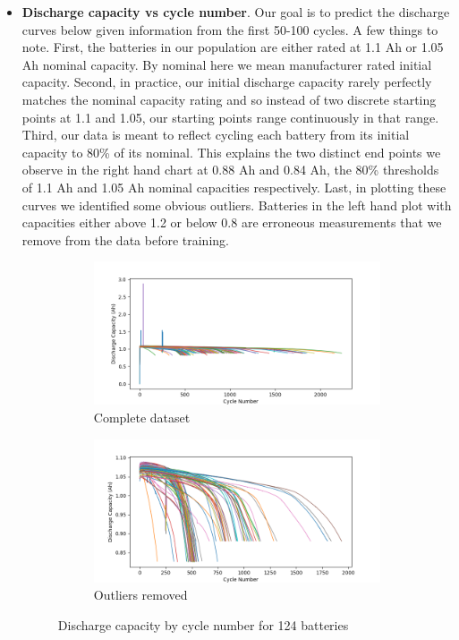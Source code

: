 \begin{itemize}
    \item \textbf{Discharge capacity vs cycle number}. Our goal is to predict the discharge curves below given information from the first 50-100 cycles. A few things to note. First, the batteries in our population are either rated at 1.1 Ah or 1.05 Ah nominal capacity. By nominal here we mean manufacturer rated initial capacity. Second, in practice, our initial discharge capacity rarely perfectly matches the nominal capacity rating and so instead of two discrete starting points at 1.1 and 1.05, our starting points range continuously in that range. Third, our data is meant to reflect cycling each battery from its initial capacity to 80\% of its nominal. This explains the two distinct end points we observe in the right hand chart at 0.88 Ah and 0.84 Ah, the 80\% thresholds of 1.1 Ah and 1.05 Ah nominal capacities respectively. Last, in plotting these curves we identified some obvious outliers. Batteries in the left hand plot with capacities either above 1.2 or below 0.8 are erroneous measurements that we remove from the data before training.  

        \begin{figure}[H]
            \centering
            \begin{subfigure}[b]{0.49\linewidth}
                \includegraphics[width=\linewidth]{figs/discharge_capacity_by_cycle.png}
                \caption{Complete dataset}
            \end{subfigure}
            \begin{subfigure}[b]{0.49\linewidth}
                \includegraphics[width=\linewidth]{figs/discharge_capacity_by_cycle_remove_outliers.png}
                \caption{Outliers removed}
            \end{subfigure}
            \caption{Discharge capacity by cycle number for 124 batteries}
            \label{fig:3a}
        \end{figure}


\end{itemize}
